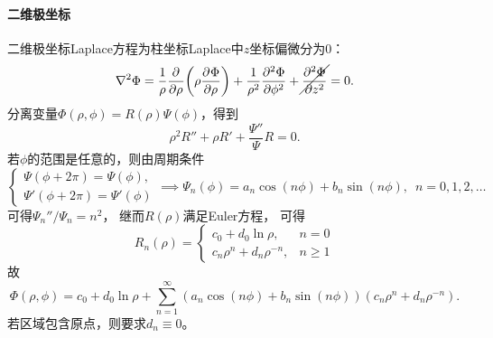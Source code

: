 \paragraph{二维极坐标}
二维极坐标Laplace方程为柱坐标Laplace中$z$坐标偏微分为0：
\begin{equation}
    \lap\Phi=\frac1\rho\pp\rho\biggkh{\rho\pv\Phi\rho}+\frac1{\rho^2}\pv[2]\Phi\phi+\cancel{\pv[2]\Phi z}%
    =0.
\end{equation}
分离变量$\Phi(\rho,\phi)=R(\rho)\Psi(\phi)$，得到
\[
    \rho^2R''+\rho R'+\frac{\Psi''}\Psi R=0.
\]
若$\phi$的范围是任意的，则由周期条件
\[
    \begin{cases}
        \Psi(\phi+2\pi)=\Psi(\phi),\\
        \Psi'(\phi+2\pi)=\Psi'(\phi)
    \end{cases}\implies
    \Psi_n(\phi)=a_n\cos(n\phi)+b_n\sin(n\phi),
    \enspace n=0,1,2,\ldots
\]
可得$\Psi_n''/\Psi_n=n^2$，
继而$R(\rho)$满足Euler方程，
可得
\[
    R_n(\rho)=
    \begin{cases}
        c_0+d_0\ln\rho,&n=0\\
        c_n\rho^n+d_n\rho^{-n},&n\geqslant 1
    \end{cases}
\]
故
\begin{equation}
    \Phi(\rho,\phi)=c_0+d_0\ln\rho+\sum_{n=1}^{\infty}(a_n\cos(n\phi)+b_n\sin(n\phi))(c_n\rho^n+d_n\rho^{-n}).
\end{equation}
若区域包含原点，则要求$d_n\equiv 0$。
